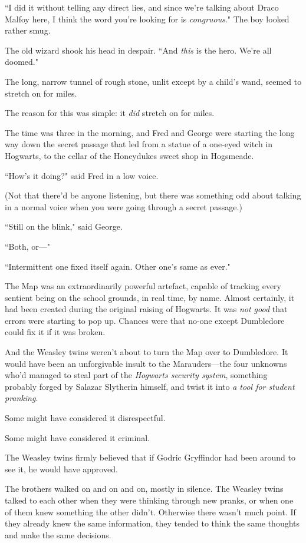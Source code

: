 ``I did it without telling any direct lies, and since we're talking about Draco Malfoy here, I think the word you're looking for is \emph{congruous}." The boy looked rather smug.

The old wizard shook his head in despair. ``And \emph{this} is the hero. We're all doomed."


The long, narrow tunnel of rough stone, unlit except by a child's wand, seemed to stretch on for miles.

The reason for this was simple: it \emph{did} stretch on for miles.

The time was three in the morning, and Fred and George were starting the long way down the secret passage that led from a statue of a one-eyed witch in Hogwarts, to the cellar of the Honeydukes sweet shop in Hogsmeade.

``How's it doing?" said Fred in a low voice.

(Not that there'd be anyone listening, but there was something odd about talking in a normal voice when you were going through a secret passage.)

``Still on the blink," said George.

``Both, or—"

``Intermittent one fixed itself again. Other one's same as ever."

The Map was an extraordinarily powerful artefact, capable of tracking every sentient being on the school grounds, in real time, by name. Almost certainly, it had been created during the original raising of Hogwarts. It was \emph{not good} that errors were starting to pop up. Chances were that no-one except Dumbledore could fix it if it was broken.

And the Weasley twins weren't about to turn the Map over to Dumbledore. It would have been an unforgivable insult to the Marauders—the four unknowns who'd managed to steal part of the \emph{Hogwarts security system}, something probably forged by Salazar Slytherin himself, and twist it into \emph{a tool for student pranking}.

Some might have considered it disrespectful.

Some might have considered it criminal.

The Weasley twins firmly believed that if Godric Gryffindor had been around to see it, he would have approved.

The brothers walked on and on and on, mostly in silence. The Weasley twins talked to each other when they were thinking through new pranks, or when one of them knew something the other didn't. Otherwise there wasn't much point. If they already knew the same information, they tended to think the same thoughts and make the same decisions.

